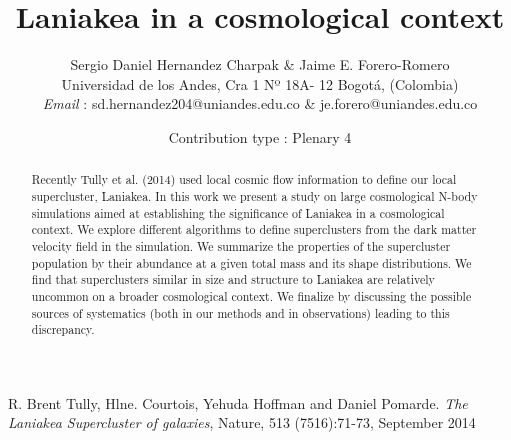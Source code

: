 \documentclass{article}
\begin{document}
\title{Laniakea in a cosmological context}
\author{Sergio Daniel Hernandez Charpak \& Jaime E. Forero-Romero \\
{\small  Universidad de los Andes, Cra 1 Nº 18A- 12 Bogot\'{a}, (Colombia)} \\
{\small {\itshape Email} : sd.hernandez204@uniandes.edu.co \& je.forero@uniandes.edu.co}}



%

\date{Contribution type : Plenary 4}

%

\maketitle


\begin{abstract} 
Recently Tully et al. (2014) used local cosmic flow information to
define our local supercluster, Laniakea. 
In this work we present a study on large cosmological N-body
simulations aimed at establishing the significance of Laniakea in a
cosmological context.
We explore different algorithms to define superclusters from the dark
matter velocity field in the simulation. 
We summarize the properties of the supercluster population by their
abundance at a given total mass and its shape distributions.
We find that superclusters similar in size and structure to Laniakea are
relatively uncommon on a broader cosmological context.
We finalize by discussing the possible sources of systematics (both in
our methods and in observations) leading to this discrepancy.
\end{abstract}


\begin{thebibliography}{00} 
 R. Brent Tully, Hlne. Courtois, Yehuda Hoffman and Daniel Pomarde. 
{\em The Laniakea Supercluster of galaxies}, Nature, 513 (7516):71-73, September 2014 


\end{thebibliography} 
\end{document}
